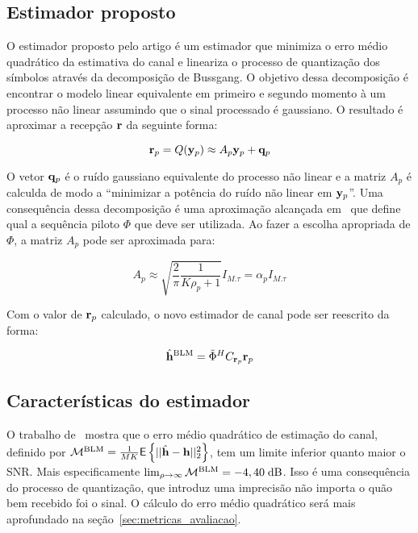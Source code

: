 \documentclass{article}
\newcommand{\dB}{\text{dB}}
\begin{document}
	\subsection{Estimador proposto}

	O estimador proposto pelo artigo é um estimador que minimiza o erro médio quadrático da estimativa do canal e lineariza o processo de quantização dos símbolos através da decomposição de Bussgang. O objetivo dessa decomposição é encontrar o modelo linear equivalente em primeiro e segundo momento à um processo não linear assumindo que o sinal processado é gaussiano. O resultado é aproximar a recepção $\mathbf{r}$ da seguinte forma:

	\begin{equation}
		\mathbf{r}_p = Q(\mathbf{y}_p) \approx A_p\mathbf{y}_p + \mathbf{q}_p
		\label{eq:decomposicao_bussgang}
	\end{equation}
	
	O vetor $\mathbf{q}_p$ é o ruído gaussiano equivalente do processo não linear e a matriz $A_p$ é calculda de modo a ``minimizar a potência do ruído não linear em $\mathbf{y}_p$''. Uma consequência dessa decomposição é uma aproximação alcançada em~\cite{li.etal_2017a} que define qual a sequência piloto $\Phi$ que deve ser utilizada. Ao fazer a escolha apropriada de $\Phi$, a matriz $A_p$ pode ser aproximada para:

	\begin{equation}
		A_p \approx \sqrt{\frac{2}{\pi}\frac{1}{K\rho_p+1}}I_{M.\tau} = \alpha_p I_{M.\tau}
		\label{eq:calculo_matriz_ap_simplificada}
	\end{equation}

	Com o valor de $\mathbf{r}_p$ calculado, o novo estimador de canal pode ser reescrito da forma:
	
	\begin{equation}
		\hat{\mathbf{h}}^{\text{BLM}}=\tilde{\Phi}^H C_{\mathbf{r}_p}\mathbf{r}_p
		\label{eq:estimador_bussgang}
	\end{equation}
	
	\subsection{Características do estimador}

	O trabalho de~\cite{li.etal_2017a} mostra que o erro médio quadrático de estimação do canal, definido por $\mathcal{M}^{\text{BLM}}=\frac{1}{MK} \mathsf{E} \left\{ ||\hat{\mathbf{h}}-\mathbf{h}||^2_2 \right\} $, tem um limite inferior quanto maior o SNR. Mais especificamente $\lim_{\rho\to\infty}\Mcal^{\text{BLM}}=-4,40\;\dB$. Isso é uma consequência do processo de quantização, que introduz uma imprecisão não importa o quão bem recebido foi o sinal. O cálculo do erro médio quadrático será mais aprofundado na seção~\ref{sec:metricas_avaliacao}.
	
\end{document}
